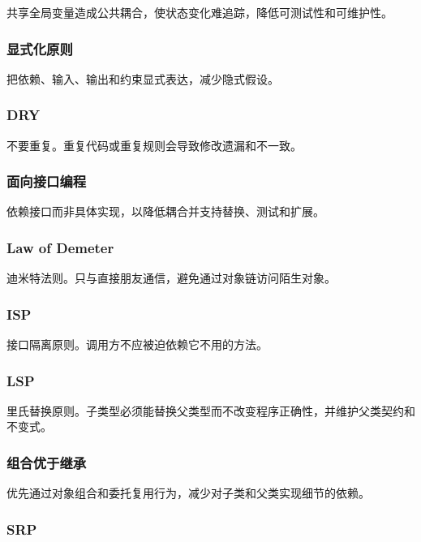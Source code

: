 \documentclass[UTF8,zihao=-4]{ctexart}
\begin{document}
共享全局变量造成公共耦合，使状态变化难追踪，降低可测试性和可维护性。


\subsubsection*{显式化原则}


把依赖、输入、输出和约束显式表达，减少隐式假设。


\subsubsection*{DRY}


不要重复。重复代码或重复规则会导致修改遗漏和不一致。


\subsubsection*{面向接口编程}


依赖接口而非具体实现，以降低耦合并支持替换、测试和扩展。


\subsubsection*{Law of Demeter}


迪米特法则。只与直接朋友通信，避免通过对象链访问陌生对象。


\subsubsection*{ISP}


接口隔离原则。调用方不应被迫依赖它不用的方法。


\subsubsection*{LSP}


里氏替换原则。子类型必须能替换父类型而不改变程序正确性，并维护父类契约和不变式。


\subsubsection*{组合优于继承}


优先通过对象组合和委托复用行为，减少对子类和父类实现细节的依赖。


\subsubsection*{SRP}
\end{document}
